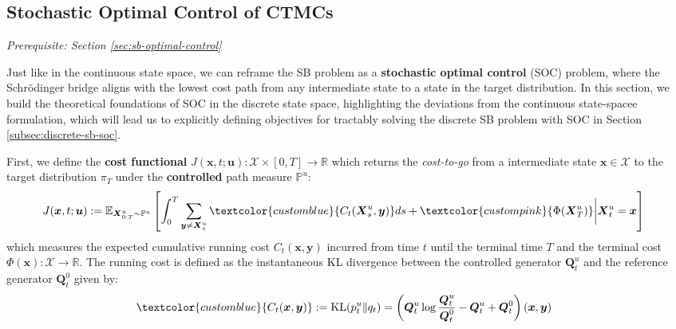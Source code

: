 \documentclass{article}
\newcommand{\boldtext}[1]{\textbf{\textcolor{MyGreen}{#1}}}
\newcommand{\bluetext}[1]{\textcolor{customblue}{#1}}
\newcommand{\pinktext}[1]{\textcolor{custompink}{#1}}
\begin{document}
\subsection{Stochastic Optimal Control of CTMCs}
\label{subsec:soc-ctmcs}
\textit{Prerequisite: Section \ref{sec:sb-optimal-control}}

Just like in the continuous state space, we can reframe the SB problem as a \boldtext{stochastic optimal control} (SOC) problem, where the Schrödinger bridge aligns with the lowest cost path from any intermediate state to a state in the target distribution. In this section, we build the theoretical foundations of SOC in the discrete state space, highlighting the deviations from the continuous state-spacee formulation, which will lead us to explicitly defining objectives for tractably solving the discrete SB problem with SOC in Section \ref{subsec:discrete-sb-soc}.

First, we define the \boldtext{cost functional} $J(\boldsymbol{x},t;\boldsymbol{u}):\mathcal{X}\times [0,T]\to \mathbb{R}$ which returns the \textit{cost-to-go} from a intermediate state $\boldsymbol{x}\in \mathcal{X}$ to the target distribution $\pi_T$ under the \textbf{controlled} path measure $\mathbb{P}^u$:
\begin{align}
    J(\boldsymbol{x},t;\boldsymbol{u})&:=\mathbb{E}_{\boldsymbol{X}^u_{0:T}\sim \mathbb{P}^u}\left[\int_0^T\sum_{\boldsymbol{y}\neq \boldsymbol{X}^u_s}\bluetext{C_t(\boldsymbol{X}^u_s,\boldsymbol{y})}ds +\pinktext{\Phi(\boldsymbol{X}^u_T)}\bigg|\boldsymbol{X}^u_t=\boldsymbol{x}\right]
\end{align}
which measures the expected cumulative running cost $C_t(\boldsymbol{x},\boldsymbol{y})$ incurred from time $t$ until the terminal time $T$ and the terminal cost $\Phi(\boldsymbol{x}):\mathcal{X}\to \mathbb{R}$. The running cost is defined as the instantaneous KL divergence between the controlled generator $\boldsymbol{Q}^u_t$ and the reference generator $\boldsymbol{Q}^0_t$ given by:
\begin{align}
    \bluetext{C_t(\boldsymbol{x},\boldsymbol{y})}&:=\text{KL}(p^u_t\|q_t)=\left(\boldsymbol{Q}_t^u\log \frac{\boldsymbol{Q}_t^u}{\boldsymbol{Q}_t^0}-\boldsymbol{Q}_t^u+\boldsymbol{Q}^0_t\right)(\boldsymbol{x}, \boldsymbol{y})
\end{align}
\end{document}
